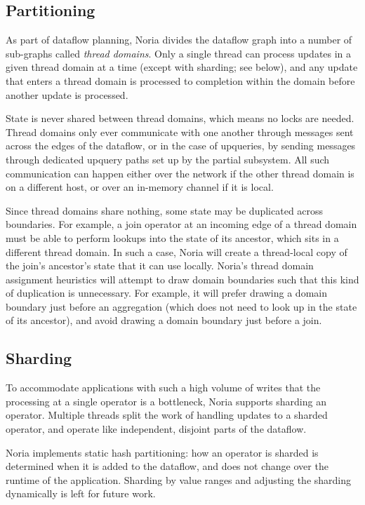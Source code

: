 \subsection{Partitioning}

As part of dataflow planning, Noria divides the dataflow graph into a number of
sub-graphs called \textit{thread domains}. Only a single thread can process
updates in a given thread domain at a time (except with sharding; see below),
and any update that enters a thread domain is processed to completion within
the domain before another update is processed.

State is never shared between thread domains, which means no locks are needed.
Thread domains only ever communicate with one another through messages sent
across the edges of the dataflow, or in the case of upqueries, by sending
messages through dedicated upquery paths set up by the partial subsystem. All
such communication can happen either over the network if the other thread domain
is on a different host, or over an in-memory channel if it is local.

Since thread domains share nothing, some state may be duplicated across
boundaries. For example, a join operator at an incoming edge of a thread domain
must be able to perform lookups into the state of its ancestor, which sits in a
different thread domain. In such a case, Noria will create a thread-local copy
of the join's ancestor's state that it can use locally. Noria's thread domain
assignment heuristics will attempt to draw domain boundaries  such that this
kind of duplication is unnecessary. For example, it will prefer drawing a domain
boundary just before an aggregation (which does not need to look up in the state
of its ancestor), and avoid drawing a domain boundary just before a join.

\subsection{Sharding}

To accommodate applications with such a high volume of writes that the
processing at a single operator is a bottleneck, Noria supports sharding an
operator. Multiple threads split the work of handling updates to a sharded
operator, and operate like independent, disjoint parts of the dataflow.

Noria implements static hash partitioning: how an operator is sharded is
determined when it is added to the dataflow, and does not change over the
runtime of the application. Sharding by value ranges and adjusting the sharding
dynamically is left for future work.

